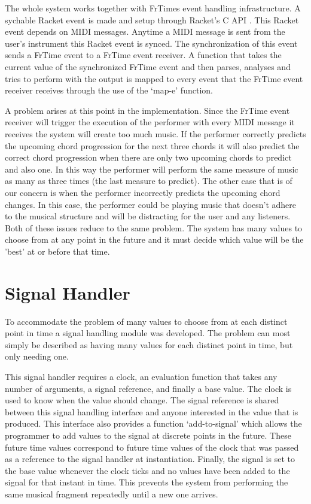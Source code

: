 \documentclass[12pt]{ucthesis}
\begin{document}
{The whole system works together with FrTimes event handling infrastructure. A sychable Racket event is made and setup through Racket's C API . This Racket event depends on MIDI messages. Anytime a MIDI message is sent from the user's instrument this Racket event is synced. The synchronization of this event sends a FrTime event to a FrTime event receiver. A function that takes the current value of the synchronized FrTime event and then parses, analyses and tries to perform with the output is mapped to every event that the FrTime event receiver receives through the use of the `map-e' function.

A problem arises at this point in the implementation. Since the FrTime event receiver will trigger the execution of the performer with every MIDI message it receives the system will create too much music. If the performer correctly predicts the upcoming chord progression for the next three chords it will also predict the correct chord progression when there are only two upcoming chords to predict and also one. In this way the performer will perform the same measure of music as many as three times (the last measure to predict). The other case that is of our concern is when the performer incorrectly predicts the upcoming chord changes. In this case, the performer could be playing music that doesn't adhere to the musical structure and will be distracting for the user and any listeners. Both of these issues reduce to the same problem. The system has many values to choose from at any point in the future and it must decide which value will be the 'best' at or before that time.

\section{Signal Handler}
\label {signal-handler}
To accommodate the problem of many values to choose from at each distinct point in time a signal handling module was developed. The problem can most simply be described as having many values for each distinct point in time, but only needing one. 

This signal handler requires a clock, an evaluation function that takes any number of arguments, a signal reference, and finally a base value. The clock is used to know when the value should change. The signal reference is shared between this signal handling interface and anyone interested in the value that is produced. This interface also provides a function `add-to-signal' which allows the programmer to add values to the signal at discrete points in the future. These future time values correspond to future time values of the clock that was passed as a reference to the signal handler at instantiation. Finally, the signal is set to the base value whenever the clock ticks and no values have been added to the signal for that instant in time. This prevents the system from performing the same musical fragment repeatedly until a new one arrives. 

}
\end{document}
